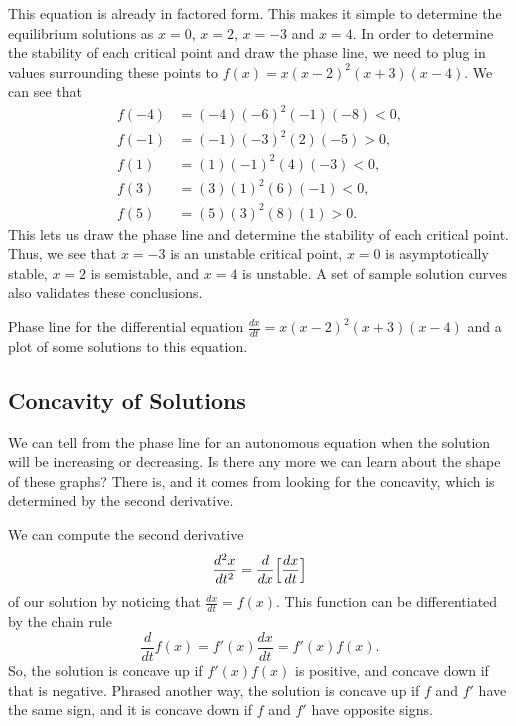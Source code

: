 \begin{exampleSol}
This equation is already in factored form. This makes it simple to determine the equilibrium solutions as $x=0$, $x=2$, $x=-3$ and $x=4$. In order to determine the stability of each critical point and draw the phase line, we need to plug in values surrounding these points to $f(x) = x(x-2)^2(x+3)(x-4)$. We can see that
\begin{equation*}
\begin{split}
f(-4) &= (-4)(-6)^2(-1)(-8) < 0, \\
f(-1) &= (-1)(-3)^2(2)(-5) > 0, \\
f(1) &= (1)(-1)^2(4)(-3) < 0, \\
f(3) &= (3)(1)^2(6)(-1) < 0, \\
f(5) &= (5)(3)^2(8)(1) > 0.
\end{split}
\end{equation*}
This lets us draw the phase line and determine the stability of each critical point. Thus, we see that $x=-3$ is an unstable critical point, $x=0$ is asymptotically stable, $x=2$ is semistable, and $x=4$ is unstable. A set of sample solution curves also validates these conclusions.
\begin{myfig}
\capstart
{}
\caption{Phase line for the differential equation $\frac{dx}{dt} = x(x-2)^2(x+3)(x-4)$ and a plot of some solutions to this equation.\label{autoexsolplot:fig}}
\end{myfig}
\end{exampleSol}

\subsection{Concavity of Solutions}

We can tell from the phase line for an autonomous equation when the solution will be increasing or decreasing. Is there any more we can learn about the shape of these graphs? There is, and it comes from looking for the concavity, which is determined by the second derivative.

We can compute the second derivative 
\begin{equation*}
\frac{d^2x}{dt^2} = \frac{d}{dx} \Bigl[ \frac{dx}{dt} \Bigr]
\end{equation*}
of our solution by noticing that $\frac{dx}{dt} = f(x)$. This function can be differentiated by the chain rule
\begin{equation*}
\frac{d}{dt} f(x) = f'(x) \frac{dx}{dt} = f'(x) f(x).
\end{equation*}
So, the solution is concave up if $f'(x)f(x)$ is positive, and concave down if that is negative. Phrased another way, the solution is concave up if $f$ and $f'$ have the same sign, and it is concave down if $f$ and $f'$ have opposite signs. 

